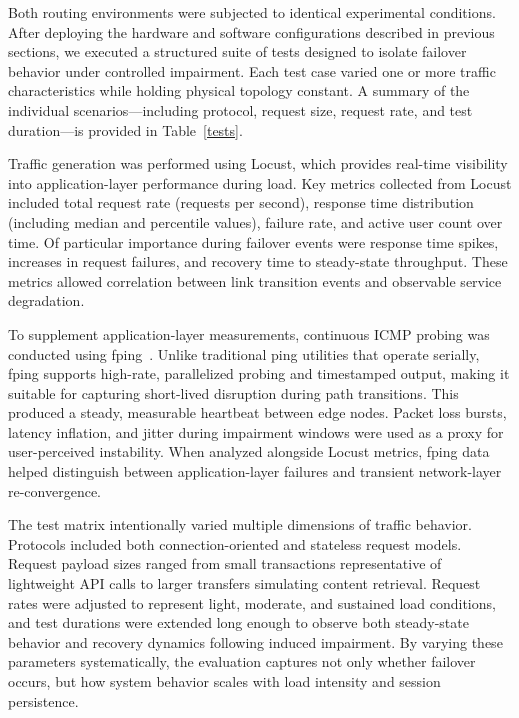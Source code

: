 \documentclass[conference]{IEEEtran}
\begin{document}
Both routing environments were subjected to identical experimental conditions. After deploying the hardware and software configurations described in previous sections, we executed a structured suite of tests designed to isolate failover behavior under controlled impairment. Each test case varied one or more traffic characteristics while holding physical topology constant. A summary of the individual scenarios—including protocol, request size, request rate, and test duration—is provided in Table~\ref{tests}.

Traffic generation was performed using Locust, which provides real-time visibility into application-layer performance during load. Key metrics collected from Locust included total request rate (requests per second), response time distribution (including median and percentile values), failure rate, and active user count over time. Of particular importance during failover events were response time spikes, increases in request failures, and recovery time to steady-state throughput. These metrics allowed correlation between link transition events and observable service degradation.

To supplement application-layer measurements, continuous ICMP probing was conducted using fping~\cite{fping}. Unlike traditional ping utilities that operate serially, fping supports high-rate, parallelized probing and timestamped output, making it suitable for capturing short-lived disruption during path transitions. This produced a steady, measurable heartbeat between edge nodes. Packet loss bursts, latency inflation, and jitter during impairment windows were used as a proxy for user-perceived instability. When analyzed alongside Locust metrics, fping data helped distinguish between application-layer failures and transient network-layer re-convergence.

The test matrix intentionally varied multiple dimensions of traffic behavior. Protocols included both connection-oriented and stateless request models. Request payload sizes ranged from small transactions representative of lightweight API calls to larger transfers simulating content retrieval. Request rates were adjusted to represent light, moderate, and sustained load conditions, and test durations were extended long enough to observe both steady-state behavior and recovery dynamics following induced impairment. By varying these parameters systematically, the evaluation captures not only whether failover occurs, but how system behavior scales with load intensity and session persistence.
\end{document}
